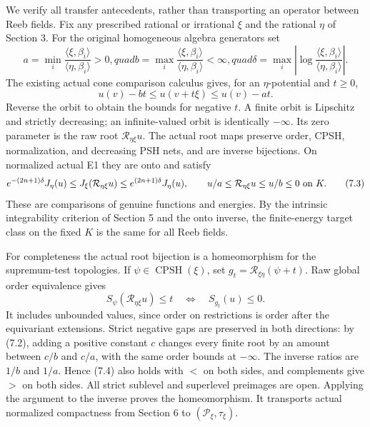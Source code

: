\documentclass[
  10pt,
]{article}
\begin{document}
We verify all transfer antecedents, rather than transporting an operator
between Reeb fields. Fix any prescribed rational or irrational \(\xi\)
and the rational \(\eta\) of Section 3. For the original homogeneous
algebra generators set \[
 a=\min_i\frac{\langle\xi,\beta_i\rangle}
                    {\langle\eta,\beta_i\rangle}>0,quad
 b=\max_i\frac{\langle\xi,\beta_i\rangle}
                    {\langle\eta,\beta_i\rangle}<\infty,quad
 \delta=\max_i\left|\log\frac{\langle\xi,\beta_i\rangle}
                            {\langle\eta,\beta_i\rangle}\right|.
                                                               \tag{7.1}
\] The existing actual cone comparison calculus gives, for an
\(\eta\)-potential and \(t\geq0\), \[
 u(v)-bt\leq u(v+t\xi)\leq u(v)-at.                            \tag{7.2}
\] Reverse the orbit to obtain the bounds for negative \(t\). A finite
orbit is Lipschitz and strictly decreasing; an infinite-valued orbit is
identically \(-\infty\). Its zero parameter is the raw root
\(\mathcal R_{\eta\xi}u\). The actual root maps preserve order, CPSH,
normalization, and decreasing PSH nets, and are inverse bijections. On
normalized actual E1 they are onto and satisfy \[
 e^{-(2n+1)\delta}J_\eta(u)
 \leq J_\xi(\mathcal R_{\eta\xi}u)
 \leq e^{(2n+1)\delta}J_\eta(u),\qquad
       u/a\leq\mathcal R_{\eta\xi}u\leq u/b\leq0\ \hbox{on }K.
                                                               \tag{7.3}
\] These are comparisons of genuine functions and energies. By the
intrinsic integrability criterion of Section 5 and the onto inverse, the
finite-energy target class on the fixed \(K\) is the same for all Reeb
fields.

For completeness the actual root bijection is a homeomorphism for the
supremum-test topologies. If \(\psi\in\operatorname{CPSH}(\xi)\), set
\(g_t=\mathcal R_{\xi\eta}(\psi+t)\). Raw global order equivalence gives
\[
 S_\psi(\mathcal R_{\eta\xi}u)\leq t
              \quad\Longleftrightarrow\quad S_{g_t}(u)\leq0.    \tag{7.4}
\] It includes unbounded values, since order on restrictions is order
after the equivariant extensions. Strict negative gaps are preserved in
both directions: by (7.2), adding a positive constant \(c\) changes
every finite root by an amount between \(c/b\) and \(c/a\), with the
same order bounds at \(-\infty\). The inverse ratios are \(1/b\) and
\(1/a\). Hence (7.4) also holds with \(<\) on both sides, and
complements give \(>\) on both sides. All strict sublevel and superlevel
preimages are open. Applying the argument to the inverse proves the
homeomorphism. It transports actual normalized compactness from Section
6 to \((\mathcal P_\xi,\tau_\xi)\).
\end{document}
